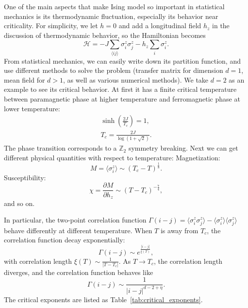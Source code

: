 \documentclass{article}
\theoremstyle{plain} \newtheorem{thm}{Theorem}[section]
\theoremstyle{definition} \newtheorem{df}{Definition}[section]
\theoremstyle{definition} \newtheorem{eg}{Example}
\theoremstyle{remark} \newtheorem*{rmk}{Remark}
\begin{document}
One of the main aspects that make Ising model so important in statistical mechanics is its thermodynamic fluctuation, especially its behavior near criticality. For simplicity, we let $h=0$ and add a longitudinal field $h_z$ in the discussion of thermodynamic behavior, so the Hamiltonian becomes
\begin{equation}
	\mathcal{H}=-J\sum_{\langle ij\rangle}\sigma^z_i\sigma^z_j-h_z\sum_i\sigma_i^z.
\end{equation}
From statistical mechanics, we can easily write down its partition function, and use different methods to solve the problem (transfer matrix for dimension $d=1$, mean field for $d>1$, as well as various numerical methods). We take $d=2$ as an example to see its critical behavior. At first it has a finite critical temperature between paramagnetic phase at higher temperature and ferromagnetic phase at lower temperature:
\begin{gather}
	\sinh\left(\frac{2J}{T_c}\right)=1,\\
	T_c=\frac{2J}{\log(1+\sqrt{2})}.
\end{gather} 
The phase transition corresponds to a $\mathbb{Z}_2$ symmetry breaking. Next we can get different physical quantities with respect to temperature:
Magnetization:
\begin{equation}
	M=\langle\sigma_i^z\rangle\sim(T_c-T)^{\frac{1}{8}}.
\end{equation}
Susceptibility:
\begin{equation}
	\chi=\frac{\partial M}{\partial h_z}\sim(T-T_c)^{-\frac{7}{4}},
\end{equation}
and so on. 

In particular, the two-point correlation function $\Gamma(i-j)=\langle\sigma_i^z\sigma_j^z\rangle-\langle\sigma_i^z\rangle\langle\sigma_j^z\rangle$ behave differently at different temperature. When $T$ is away from $T_c$, the correlation function decay exponentially:
\begin{equation}
	\Gamma(i-j)\sim e^{\frac{|i-j|}{\xi(T)}},
\end{equation}
with correlation length $\xi(T)\sim\frac{1}{|T-T_c|}$. As $T\rightarrow T_c$, the correlation length diverges, and the correlation function behaves like
\begin{equation}
	\Gamma(i-j)\sim\frac{1}{|i-j|^{d-2+\eta}}.
\end{equation}
The critical exponents are listed as Table~\ref{tab:critical_exponents}.
\end{document}
